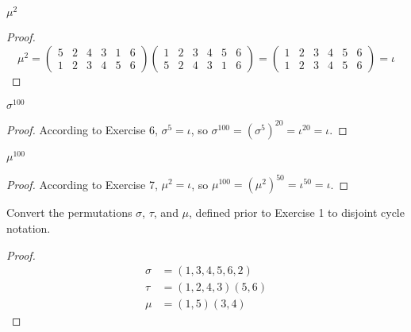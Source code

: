 \newpage
\begin{exercise}
    $\mu^{2}$
\end{exercise}

\begin{proof}
    \[
        \mu^{2} =
        \begin{pmatrix}
            5 & 2 & 4 & 3 & 1 & 6 \\
            1 & 2 & 3 & 4 & 5 & 6
        \end{pmatrix}
        \begin{pmatrix}
            1 & 2 & 3 & 4 & 5 & 6 \\
            5 & 2 & 4 & 3 & 1 & 6
        \end{pmatrix} =
        \begin{pmatrix}
            1 & 2 & 3 & 4 & 5 & 6 \\
            1 & 2 & 3 & 4 & 5 & 6
        \end{pmatrix} =
        \iota
    \]
\end{proof}

\newpage
\begin{exercise}
    $\sigma^{100}$
\end{exercise}

\begin{proof}
    According to Exercise 6, $\sigma^{5} = \iota$, so $\sigma^{100} = {(\sigma^{5})}^{20} = \iota^{20} = \iota$.
\end{proof}

\newpage
\begin{exercise}
    $\mu^{100}$
\end{exercise}

\begin{proof}
    According to Exercise 7, $\mu^{2} = \iota$, so $\mu^{100} = {(\mu^{2})}^{50} = \iota^{50} = \iota$.
\end{proof}

\newpage
\begin{exercise}
    Convert the permutations $\sigma$, $\tau$, and $\mu$, defined prior to Exercise 1 to disjoint cycle notation.
\end{exercise}

\begin{proof}
    \[
        \begin{split}
            \sigma & = (1, 3, 4, 5, 6, 2) \\
            \tau   & = (1, 2, 4, 3)(5, 6) \\
            \mu    & = (1, 5)(3, 4)
        \end{split}
    \]
\end{proof}

